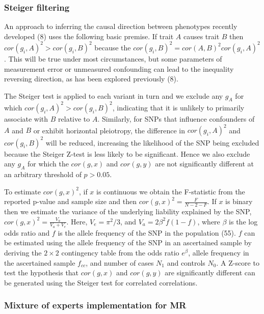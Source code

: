 \documentclass[]{article}
\begin{document}
\subsubsection{Steiger filtering}\label{steiger-filtering-1}

An approach to inferring the causal direction between phenotypes
recently developed (8) uses the following basic premise. If trait \(A\)
causes trait \(B\) then \(cor(g_{i}, A)^2 > cor(g_{i}, B)^2\) because
the \(cor(g_{i}, B)^2 = cor(A, B)^{2} cor(g_{i}, A)^{2}\). This will be
true under most circumstances, but some parameters of measurement error
or unmeasured confounding can lead to the inequality reversing
direction, as has been explored previously (8).

The Steiger test is applied to each variant in turn and we exclude any
\(g_{A}\) for which \(cor(g_{i}, A)^2 > cor(g_{i}, B)^2\), indicating
that it is unlikely to primarily associate with \(B\) relative to \(A\).
Similarly, for SNPs that influence confounders of \(A\) and \(B\) or
exhibit horizontal pleiotropy, the difference in \(cor(g_{i}, A)^2\) and
\(cor(g_{i}, B)^2\) will be reduced, increasing the likelihood of the
SNP being excluded because the Steiger Z-test is less likely to be
significant. Hence we also exclude any \(g_{A}\) for which the
\(cor(g, x)\) and \(cor(g, y)\) are not significantly different at an
arbitrary threshold of \(p > 0.05\).

To estimate \(cor(g, x)^2\), if \(x\) is continuous we obtain the
F-statistic from the reported p-value and sample size and then
\(cor(g, x)^2 = \frac{F}{N - 2 - F}\). If \(x\) is binary then we
estimate the variance of the underlying liability explained by the SNP,
\(cor(g, x)^2 = \frac{V_a}{V_a + V_e}\). Here, \(V_e = \pi^2/3\), and
\(V_a = 2\beta^2f(1-f)\), where \(\beta\) is the log odds ratio and
\(f\) is the allele frequency of the SNP in the population (55). \(f\)
can be estimated using the allele frequency of the SNP in an ascertained
sample by deriving the \(2 \times 2\) contingency table from the odds
ratio \(e^\beta\), allele frequency in the ascertained sample
\(f_{cc}\), and number of cases \(N_1\) and controls \(N_0\). A Z-score
to test the hypothesis that \(cor(g, x)\) and \(cor(g, y)\) are
significantly different can be generated using the Steiger test for
correlated correlations.

\subsubsection{Mixture of experts implementation for
MR}\label{mixture-of-experts-implementation-for-mr}
\end{document}

